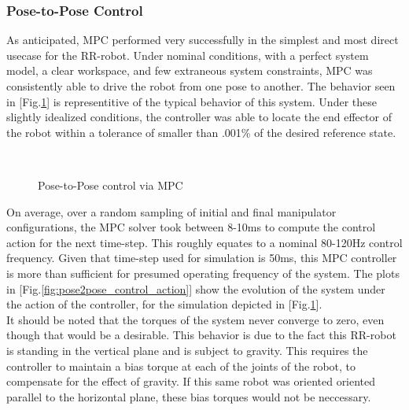 \documentclass[journal]{IEEEtran}
\begin{document}
\subsubsection{Pose-to-Pose Control}

As anticipated, MPC performed very successfully in the simplest and most direct usecase for the RR-robot. Under nominal conditions, with a perfect system model, a clear workspace, and few extraneous system constraints, MPC was consistently able to drive the robot from one pose to another. The behavior seen in [Fig.\ref{fig:pose2pose}] is representitive of the typical behavior of this system. Under these slightly idealized conditions, the controller was able to locate the end effector of the robot within a tolerance of smaller than .001\% of the desired reference state.

\begin{figure}[hb]%
    \centering
    \qquad
    \\
    \qquad
    \caption{Pose-to-Pose control via MPC}%
    \label{fig:pose2pose}%
\end{figure}

On average, over a random sampling of initial and final manipulator configurations, the MPC solver took between 8-10ms to compute the control action for the next time-step. This roughly equates to a nominal 80-120Hz control frequency. Given that time-step used for simulation is 50ms, this MPC controller is more than sufficient for presumed operating frequency of the system. The plots in [Fig.\ref{fig:pose2pose_control_action}] show the evolution of the system under the action of the controller, for the simulation depicted in [Fig.\ref{fig:pose2pose}]. \\

 It should be noted that the torques of the system never converge to zero, even though that would be a desirable. This behavior is due to the fact this RR-robot is standing in the vertical plane and is subject to gravity. This requires the controller to maintain a bias torque at each of the joints of the robot, to compensate for the effect of gravity. If this same robot was oriented oriented  parallel to the horizontal plane, these bias torques would not be neccessary. \\
\end{document}
